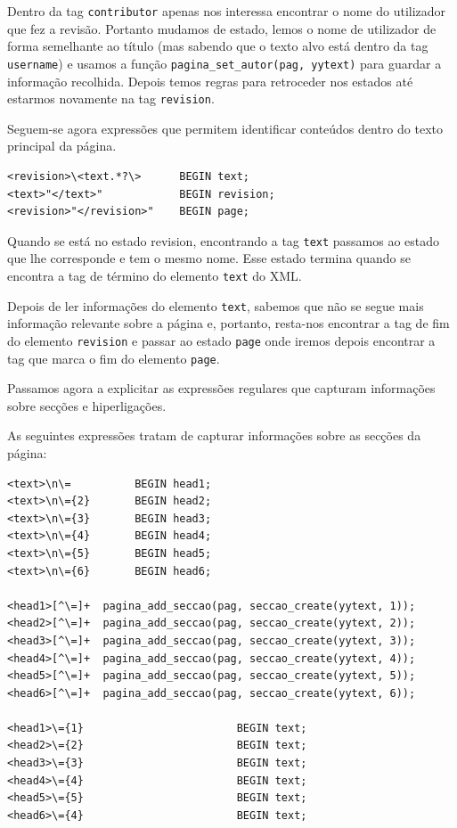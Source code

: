 \documentclass[11pt, a4paper, oneside]{article}
\begin{document}
Dentro da tag \texttt{contributor} apenas nos interessa encontrar o nome do utilizador que fez a revisão. Portanto mudamos de estado, lemos o nome de utilizador de forma semelhante ao título (mas sabendo que o texto alvo está dentro da tag \texttt{username}) e usamos a função \texttt{pagina\_set\_autor(pag, yytext)} para guardar a informação recolhida. Depois temos regras para retroceder nos estados até estarmos novamente na tag \texttt{revision}.


Seguem-se agora expressões que permitem identificar conteúdos dentro do texto principal da página.

\begin{verbatim}
<revision>\<text.*?\>      BEGIN text;
<text>"</text>"            BEGIN revision;
<revision>"</revision>"    BEGIN page;
\end{verbatim}

Quando se está no estado revision, encontrando a tag \texttt{text} passamos ao estado que lhe corresponde e tem o mesmo nome. Esse estado termina quando se encontra a tag de término do elemento \texttt{text} do XML.

Depois de ler informações do elemento \texttt{text}, sabemos que não se segue mais informação relevante sobre a página e, portanto, resta-nos encontrar a tag de fim do elemento \texttt{revision} e passar ao estado \texttt{page} onde iremos depois encontrar a tag que marca o fim do elemento \texttt{page}.

Passamos agora a explicitar as expressões regulares que capturam informações sobre secções e hiperligações.


As seguintes expressões tratam de capturar informações sobre as secções da página:

\begin{verbatim}
<text>\n\=          BEGIN head1;
<text>\n\={2}       BEGIN head2;
<text>\n\={3}       BEGIN head3;
<text>\n\={4}       BEGIN head4;
<text>\n\={5}       BEGIN head5;
<text>\n\={6}       BEGIN head6;

<head1>[^\=]+  pagina_add_seccao(pag, seccao_create(yytext, 1));
<head2>[^\=]+  pagina_add_seccao(pag, seccao_create(yytext, 2));
<head3>[^\=]+  pagina_add_seccao(pag, seccao_create(yytext, 3));
<head4>[^\=]+  pagina_add_seccao(pag, seccao_create(yytext, 4));
<head5>[^\=]+  pagina_add_seccao(pag, seccao_create(yytext, 5));
<head6>[^\=]+  pagina_add_seccao(pag, seccao_create(yytext, 6));

<head1>\={1}                        BEGIN text;
<head2>\={2}                        BEGIN text;
<head3>\={3}                        BEGIN text;
<head4>\={4}                        BEGIN text;
<head5>\={5}                        BEGIN text;
<head6>\={4}                        BEGIN text;
\end{verbatim}
\end{document}

